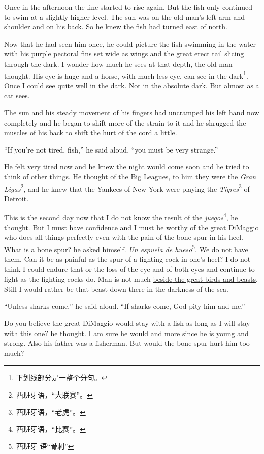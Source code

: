 \documentclass[fontset=ubuntu]{ctexrep}
\begin{document}
Once in the afternoon the line started to rise again. But the fish only
continued to swim at a \gls{slightly} higher level. The sun was on the old
man's left arm and shoulder and on his back. So he knew the fish had turned
east of north.

Now that he had seen him once, he could picture the fish swimming in the
water with his purple pectoral fins set wide as wings and the great
\gls{erect} tail \gls{slicing} through the dark. I wonder how much he sees
at that depth, the old man thought. His eye is huge and \uline{a horse, with
  much less eye, can see in the dark}\footnote{下划线部分是一整个分句。}.
Once I could see quite well in the dark. Not in the \gls{absolute} dark. But
almost as a cat sees.

The sun and his steady movement of his fingers had uncramped his left hand
now completely and he began to shift more of the strain to it and he
\gls{shrugged} the \glspl{muscle} of his back to shift the hurt of the cord
a little.

``If you're not tired, fish,'' he said aloud, ``you must be very strange.''

He felt very tired now and he knew the night would come soon and he tried to
think of other things. He thought of the Big Leagues, to him they were the
\emph{Gran Ligas}\footnote{西班牙语，“大联赛”。}, and he knew that the
Yankees of New York were playing the \emph{Tigres}\footnote{西班牙语，“老虎”。} of Detroit.

This is the second day now that I do not know the result of the
\emph{juegos}\footnote{西班牙语，“比赛”。}, he thought. But I must have
confidence and I must be worthy of the great DiMaggio who does all things
perfectly even with the pain of the bone \gls{spur} in his \gls{heel}. What
is a bone spur? he asked himself. \emph{Un espuela de hueso}\footnote{西班牙
  语“骨刺”}. We do not have them. Can it be as painful as the spur of a
fighting cock in one's heel? I do not think I could endure that or the loss
of the eye and of both eyes and continue to fight as the fighting cocks do.
Man is not much \uline{\gls{beside} the great birds and \glspl{beast}}.
Still I would rather be that beast down there in the darkness of the sea.

``Unless sharks come,'' he said aloud. ``If sharks come, God pity him and me.''

Do you believe the great DiMaggio would stay with a fish as long as I will
stay with this one? he thought. I am sure he would and more since he is
young and strong. Also his father was a fisherman. But would the bone spur
hurt him too much?
\end{document}
